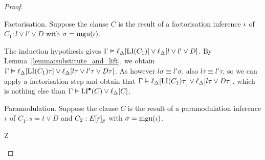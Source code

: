 \documentclass[,%
	draft=false,%
	numbers=noendperiod
	11pt,
	a4paper,
	oneside,%
	openany,
]{memoir}
\begin{document}
\begin{proof}
\begin{description}

		\item{} Factorisation. 
			Suppose the clause $C$ is the result of a factorisation inference $\iota$ of $C_1: l \lor l' \lor D$ with $\sigma=\operatorname{mgu}(\iota)$.
			
			The induction hypothesis gives $\Gamma \vDash \ell_{\Delta}[ \operatorname{LI}(C_1) ] \lor \ell_{\Delta}[ l \lor l' \lor D ]$.
			By Lemma~\ref{lemma:substitute_and_lift}, we obtain
			$\Gamma \vDash \ell_{\Delta}[ \operatorname{LI}(C_1)\tau ] \lor \ell_{\Delta}[ l\tau \lor l'\tau \lor D\tau ]$.
			As however $l\sigma \equiv l'\sigma$, 
			also $l\tau \equiv l'\tau$, so we can apply a factorisation step and obtain that
			$\Gamma \vDash \ell_{\Delta}[ \operatorname{LI}(C_1)\tau ] \lor \ell_{\Delta}[ l\tau \lor D\tau ]$,
			which is nothing else than $\Gamma \vDash \operatorname{LI}^\bullet(C) \lor \ell_{\Delta}[C]$.

		\item{} Paramodulation.
			Suppose the clause $C$ is the result of a paramodulation inference $\iota$ of $C_1: s=t \lor D$ and $C_2: E{[r]_{p}}$ with $\sigma=\operatorname{mgu}(\iota)$.

			Z



	\end{description}
\end{proof}
\end{document}
